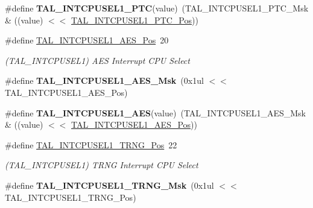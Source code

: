 \begin{DoxyCompactItemize}
\item 
\hypertarget{group___s_a_m_l21___t_a_l_gaac3fa3a095e69e2a6279d15cf5e28aa8}{}\#define {\bfseries T\+A\+L\+\_\+\+I\+N\+T\+C\+P\+U\+S\+E\+L1\+\_\+\+P\+T\+C}(value)~(T\+A\+L\+\_\+\+I\+N\+T\+C\+P\+U\+S\+E\+L1\+\_\+\+P\+T\+C\+\_\+\+Msk \& ((value) $<$$<$ \hyperlink{group___s_a_m_l21___t_a_l_gaa6fa1abcdbb81fe05838f1d65e449adf}{T\+A\+L\+\_\+\+I\+N\+T\+C\+P\+U\+S\+E\+L1\+\_\+\+P\+T\+C\+\_\+\+Pos}))\label{group___s_a_m_l21___t_a_l_gaac3fa3a095e69e2a6279d15cf5e28aa8}

\item 
\hypertarget{group___s_a_m_l21___t_a_l_ga1ae9a5787d59af3f482a24113d405979}{}\#define \hyperlink{group___s_a_m_l21___t_a_l_ga1ae9a5787d59af3f482a24113d405979}{T\+A\+L\+\_\+\+I\+N\+T\+C\+P\+U\+S\+E\+L1\+\_\+\+A\+E\+S\+\_\+\+Pos}~20\label{group___s_a_m_l21___t_a_l_ga1ae9a5787d59af3f482a24113d405979}

\begin{DoxyCompactList}\small\item\em (T\+A\+L\+\_\+\+I\+N\+T\+C\+P\+U\+S\+E\+L1) A\+E\+S Interrupt C\+P\+U Select \end{DoxyCompactList}\item 
\hypertarget{group___s_a_m_l21___t_a_l_ga411ba62ff219148c4c9b0fb9403e7ba0}{}\#define {\bfseries T\+A\+L\+\_\+\+I\+N\+T\+C\+P\+U\+S\+E\+L1\+\_\+\+A\+E\+S\+\_\+\+Msk}~(0x1ul $<$$<$ T\+A\+L\+\_\+\+I\+N\+T\+C\+P\+U\+S\+E\+L1\+\_\+\+A\+E\+S\+\_\+\+Pos)\label{group___s_a_m_l21___t_a_l_ga411ba62ff219148c4c9b0fb9403e7ba0}

\item 
\hypertarget{group___s_a_m_l21___t_a_l_ga5d67527aaef51695725420f419babc26}{}\#define {\bfseries T\+A\+L\+\_\+\+I\+N\+T\+C\+P\+U\+S\+E\+L1\+\_\+\+A\+E\+S}(value)~(T\+A\+L\+\_\+\+I\+N\+T\+C\+P\+U\+S\+E\+L1\+\_\+\+A\+E\+S\+\_\+\+Msk \& ((value) $<$$<$ \hyperlink{group___s_a_m_l21___t_a_l_ga1ae9a5787d59af3f482a24113d405979}{T\+A\+L\+\_\+\+I\+N\+T\+C\+P\+U\+S\+E\+L1\+\_\+\+A\+E\+S\+\_\+\+Pos}))\label{group___s_a_m_l21___t_a_l_ga5d67527aaef51695725420f419babc26}

\item 
\hypertarget{group___s_a_m_l21___t_a_l_gac159740f515cabecc3263fc79604f1f6}{}\#define \hyperlink{group___s_a_m_l21___t_a_l_gac159740f515cabecc3263fc79604f1f6}{T\+A\+L\+\_\+\+I\+N\+T\+C\+P\+U\+S\+E\+L1\+\_\+\+T\+R\+N\+G\+\_\+\+Pos}~22\label{group___s_a_m_l21___t_a_l_gac159740f515cabecc3263fc79604f1f6}

\begin{DoxyCompactList}\small\item\em (T\+A\+L\+\_\+\+I\+N\+T\+C\+P\+U\+S\+E\+L1) T\+R\+N\+G Interrupt C\+P\+U Select \end{DoxyCompactList}\item 
\hypertarget{group___s_a_m_l21___t_a_l_ga2c9ee28e738cb2876599b95180360ac1}{}\#define {\bfseries T\+A\+L\+\_\+\+I\+N\+T\+C\+P\+U\+S\+E\+L1\+\_\+\+T\+R\+N\+G\+\_\+\+Msk}~(0x1ul $<$$<$ T\+A\+L\+\_\+\+I\+N\+T\+C\+P\+U\+S\+E\+L1\+\_\+\+T\+R\+N\+G\+\_\+\+Pos)\label{group___s_a_m_l21___t_a_l_ga2c9ee28e738cb2876599b95180360ac1}


\end{DoxyCompactItemize}
